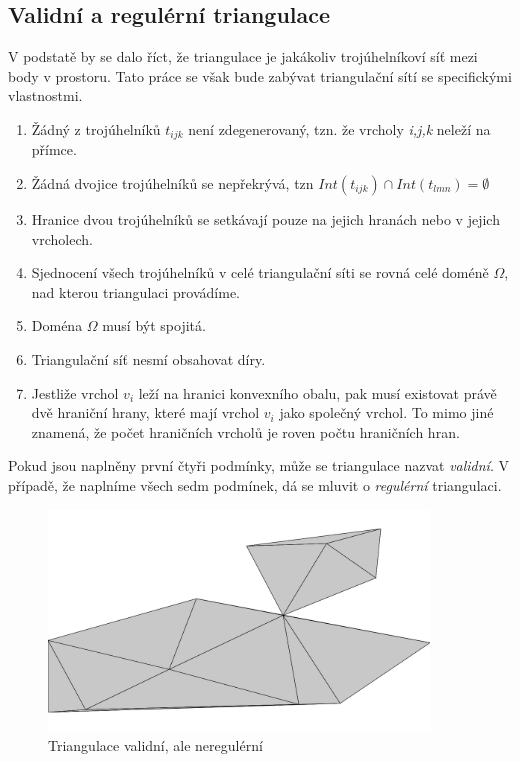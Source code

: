 \documentclass[12pt,a4paper]{article}
\begin{document}
\newpage
\subsection{Validní a regulérní triangulace}
V podstatě by se dalo říct, že triangulace je jakákoliv trojúhelníkoví síť mezi body v prostoru. Tato práce se však bude zabývat triangulační sítí se specifickými vlastnostmi.

\begin{enumerate}
\item Žádný z trojúhelníků $t_{ijk}$ není zdegenerovaný, tzn. že vrcholy \textit{i,j,k} neleží na přímce.
\item Žádná dvojice trojúhelníků se nepřekrývá, tzn $Int(t_{ijk}) \cap Int(t_{lmn}) = \emptyset$
\item Hranice dvou trojúhelníků se setkávají pouze na jejich hranách nebo v jejich vrcholech.
\item Sjednocení všech trojúhelníků v celé triangulační síti se rovná celé doméně $\Omega$, nad kterou triangulaci provádíme.
\item Doména $\Omega$ musí být spojitá.
\item Triangulační síť nesmí obsahovat díry.
\item Jestliže vrchol $v_i$ leží na hranici konvexního obalu, pak musí existovat právě dvě hraniční hrany, které mají vrchol $v_i$ jako společný vrchol. To mimo jiné znamená, že počet hraničních vrcholů je roven počtu hraničních hran.
\end{enumerate}

Pokud jsou naplněny první čtyři podmínky, může se triangulace nazvat \textit{validní}. V případě, že naplníme všech sedm podmínek, dá se mluvit o \textit{regulérní} triangulaci.

\newpage
\begin{figure}[h!]
\centering
\includegraphics[width=0.9\textwidth]{../img/vnr.png}
\caption{Triangulace validní, ale neregulérní}
\label{fig:trian_valid_not_reg}
\end{figure}
\end{document}

